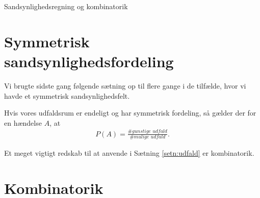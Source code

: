 \begin{center}
\Huge
Sandsynlighedsregning og kombinatorik
\end{center}
\section*{Symmetrisk sandsynlighedsfordeling}

Vi brugte sidste gang følgende sætning op til flere gange i de tilfælde, hvor vi havde et symmetrisk sandsynlighedsfelt.
\begin{setn}\label{setn:udfald}
Hvis vores udfaldsrum er endeligt og har symmetrisk fordeling, så gælder der for en hændelse $A$, at
\begin{align*}
P(A) = \frac{\# \textit{gunstige udfald}}{\#  \textit{mulige udfald}}.
\end{align*}
\end{setn}
Et meget vigtigt redskab til at anvende i Sætning \ref{setn:udfald} er kombinatorik.
\section*{Kombinatorik}

